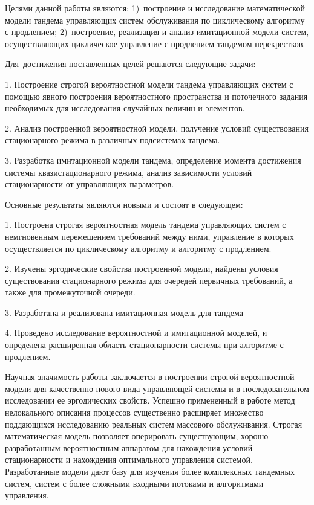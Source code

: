 {\aim} Целями данной работы являются: 1)~построение и исследование математической модели тандема управляющих систем обслуживания по циклическому алгоритму с продлением; 2)~построение, реализация и анализ имитационной модели систем, осуществляющих циклическое управление с продлением тандемом перекрестков.

Для~достижения поставленных целей решаются следующие задачи:

1. Построение строгой вероятностной модели тандема управляющих систем с помощью явного построения вероятностного пространства и поточечного задания необходимых для исследования случайных величин и элементов.

2. Анализ построенной вероятностной модели, получение условий существования стационарного режима в различных подсистемах тандема.

3. Разработка имитационной модели тандема, определение момента достижения системы квазистационарного режима, анализ зависимости условий стационарности от управляющих параметров.



{\novelty} Основные результаты являются новыми и состоят в следующем:

1. Построена строгая вероятностная модель тандема управляющих систем с немгновенным перемещением требований между ними, управление в которых осуществляется по циклическому алгоритму и алгоритму с продлением. 

2. Изучены эргодические свойства построенной модели, найдены условия существования стационарного режима для очередей первичных требований, а также для промежуточной очереди.

3. Разработана и реализована имитационная модель для тандема

4. Проведено исследование вероятностной и имитационной моделей, и определена расширенная область стационарности системы при алгоритме с продлением.




{\influence} Научная значимость работы заключается в построении строгой вероятностной модели 
для качественно нового вида управляющей системы и в последовательном исследовании ее эргодических свойств. Успешно примененный в работе метод нелокального описания процессов существенно расширяет множество поддающихся исследованию реальных систем массового обслуживания. Строгая математическая модель позволяет оперировать существующим, хорошо разработанным вероятностным аппаратом для нахождения условий стационарности и нахождения оптимального управления системой. 
 Разработанные модели дают базу для изучения более комплексных тандемных систем, систем с более сложными входными потоками и алгоритмами управления.

